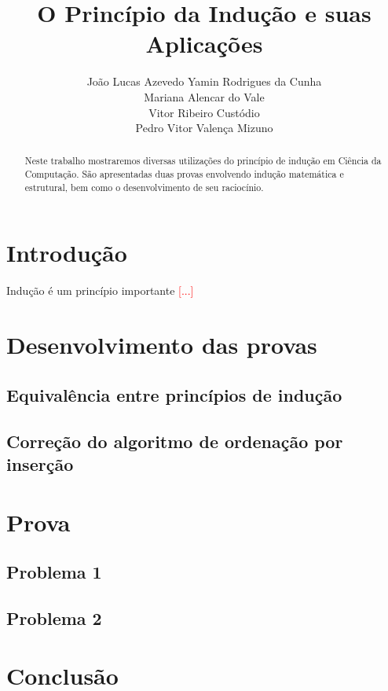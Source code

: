 \documentclass[a4paper, 10pt]{article}
\title{\LARGE \bf
O Princípio da Indução e suas Aplicações
}
\author{João Lucas Azevedo Yamin Rodrigues da Cunha \\
		Mariana Alencar do Vale \\
        Vitor Ribeiro Custódio \\
        Pedro Vitor Valença Mizuno}
\begin{document}
\maketitle

\begin{abstract}

Neste trabalho mostraremos diversas utilizações do princípio de indução em Ciência da Computação. São apresentadas duas provas envolvendo indução matemática e estrutural, bem como o desenvolvimento de seu raciocínio.

\end{abstract}

\section{Introdução}

Indução é um princípio importante \textcolor{red}{[...]}

\section{Desenvolvimento das provas}

\subsection{Equivalência entre princípios de indução}

\subsection{Correção do algoritmo de ordenação por inserção}

\section{Prova}

\subsection{Problema 1}

\subsection{Problema 2}

\section{Conclusão}
\end{document}

